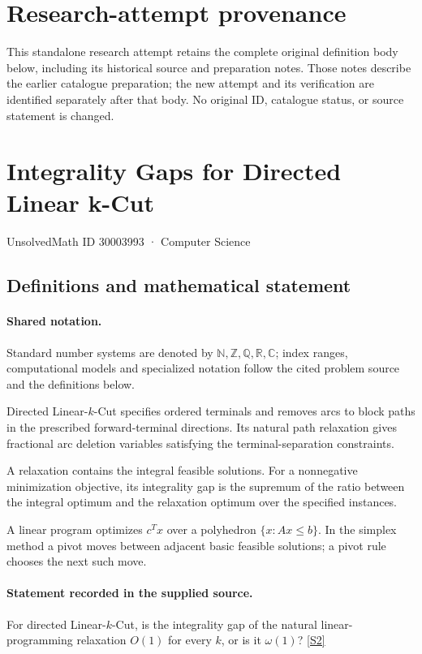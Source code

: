 \documentclass[11pt]{article}
\begin{document}
\section*{Research-attempt provenance}
This standalone research attempt retains the complete original definition body below,
including its historical source and preparation notes. Those notes describe the
earlier catalogue preparation; the new attempt and its verification are identified
separately after that body. No original ID, catalogue status, or source statement is changed.

\section{Integrality Gaps for Directed Linear k-Cut}\label{30003993}
{\small UnsolvedMath ID 30003993 · Computer Science}
\subsection{Definitions and mathematical statement}

\paragraph{Shared notation.}Standard number systems are denoted by $\mathbb N,\mathbb Z,\mathbb Q,\mathbb R,\mathbb C$; index ranges, computational models and specialized notation follow the cited problem source and the definitions below.


Directed Linear-$k$-Cut specifies ordered terminals and removes arcs to block paths in the prescribed forward-terminal directions. Its natural path relaxation gives fractional arc deletion variables satisfying the terminal-separation constraints.

A relaxation contains the integral feasible solutions. For a nonnegative minimization objective, its integrality gap is the supremum of the ratio between the integral optimum and the relaxation optimum over the specified instances.

A linear program optimizes $c^Tx$ over a polyhedron $\{x:Ax\leq b\}$. In the simplex method a pivot moves between adjacent basic feasible solutions; a pivot rule chooses the next such move.
\paragraph{Statement recorded in the supplied source.}
For directed Linear-$k$-Cut, is the integrality gap of the natural linear-programming relaxation $O(1)$ for every $k$, or is it $\omega(1)$? \href{https://doi.org/10.4171/owr/2018/50}{[S2]}
\end{document}

